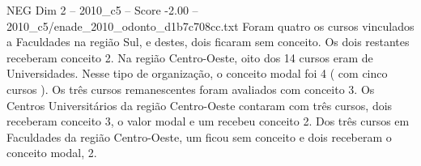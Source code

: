 \begin{textsample}{NEG Dim 2 – 2010\_c5 – Score -2.00 – 2010\_c5/enade\_2010\_odonto\_d1b7c708cc.txt}
Foram quatro os cursos vinculados a Faculdades na região Sul, e destes, dois ficaram sem conceito.
Os dois restantes receberam conceito 2.
Na região Centro-Oeste, oito dos 14 cursos eram de Universidades.
Nesse tipo de organização, o conceito modal foi 4 ( com cinco cursos ).
Os três cursos remanescentes foram avaliados com conceito 3.
Os Centros Universitários da região Centro-Oeste contaram com três cursos, dois receberam conceito 3, o valor modal e um recebeu conceito 2.
Dos três cursos em Faculdades da região Centro-Oeste, um ficou sem conceito e dois receberam o conceito modal, 2.

\end{textsample}
